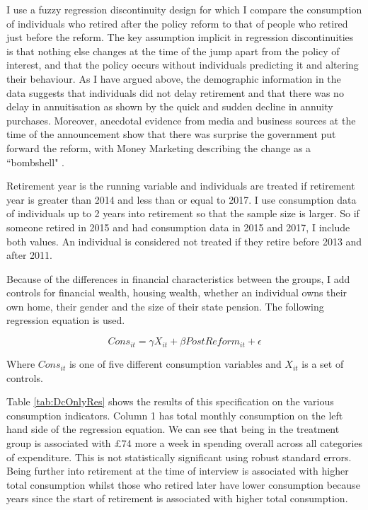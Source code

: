 \documentclass[12pt]{article}
\begin{document}
I use a fuzzy regression discontinuity design for which I compare the
consumption of individuals who retired after the policy reform to that of people
who retired just before the reform. The key assumption implicit in regression
discontinuities is that nothing else changes at the time of the jump apart from
the policy of interest, and that the policy occurs without individuals
predicting it and altering their behaviour. As I have argued above, the
demographic information in the data suggests that individuals did not delay
retirement and that there was no delay in annuitisation as shown by the quick
and sudden decline in annuity purchases. Moreover, anecdotal evidence from media
and business sources at the time of the announcement show that there was
surprise the government put forward the reform, with Money Marketing describing the
change as a ``bombshell" \cite{money_marketing_announcement}.

Retirement year is the running variable and individuals are treated if
retirement year is greater than 2014 and less than or equal to 2017. I use
consumption data of individuals up to 2 years into retirement so that the sample
size is larger. So if someone retired in 2015 and had consumption data in 2015
and 2017, I include both values. An individual is considered not treated if they
retire before 2013 and after 2011.

Because of the differences in financial characteristics between the groups, I
add controls for financial wealth, housing wealth, whether an individual owns
their own home, their gender and the size of their state pension. The following
regression equation is used.

\begin{equation*}
    Cons_{it} =  \gamma X_{it} + \beta PostReform_{it} + \epsilon
\end{equation*}

Where $Cons_{it}$ is one of five different consumption variables and $X_{it}$ is
a set of controls.

Table \ref{tab:DcOnlyRes} shows the results of this specification on the various
consumption indicators. Column 1 has total monthly consumption on the left hand
side of the regression equation. We can see that being in the treatment group is
associated with £74 more a week in spending overall across all categories of
expenditure. This is not statistically significant using robust standard errors.
Being further into retirement at the time of interview is associated with higher
total consumption whilst those who retired later have lower consumption because
years since the start of retirement is associated with higher total consumption.
\end{document}

